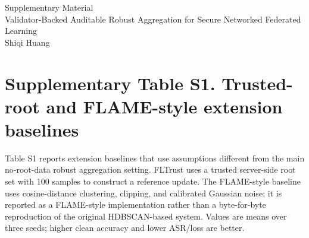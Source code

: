 \documentclass[12pt]{article}
\begin{document}
\begin{center}
{\Large Supplementary Material}\\[0.5em]
{\large Validator-Backed Auditable Robust Aggregation for Secure Networked Federated Learning}\\[0.5em]
Shiqi Huang
\end{center}

\section*{Supplementary Table S1. Trusted-root and FLAME-style extension baselines}

Table S1 reports extension baselines that use assumptions different from the main no-root-data robust aggregation setting. FLTrust uses a trusted server-side root set with 100 samples to construct a reference update. The FLAME-style baseline uses cosine-distance clustering, clipping, and calibrated Gaussian noise; it is reported as a FLAME-style implementation rather than a byte-for-byte reproduction of the original HDBSCAN-based system. Values are means over three seeds; higher clean accuracy and lower ASR/loss are better.

\begin{table}[h]
\centering
\caption*{S1a. FLTrust extension on Fashion-MNIST under main poisoning attacks.}
\end{table}
\end{document}
